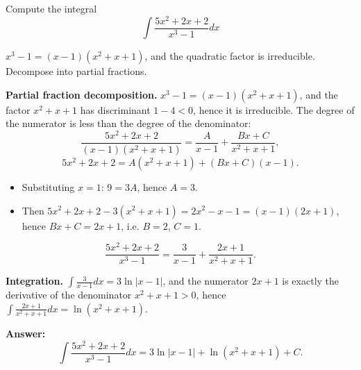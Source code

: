 
\begin{question}
Compute the integral
\[ \int\frac{5x^2+2x+2}{x^3-1}dx \]
\end{question}

\begin{hint}
$x^3-1=(x-1)(x^2+x+1)$, and the quadratic factor is irreducible. Decompose into partial fractions.
\end{hint}

\begin{solution}
\textbf{Partial fraction decomposition.} $x^3-1=(x-1)(x^2+x+1)$, and the factor $x^2+x+1$ has discriminant $1-4<0$, hence it is irreducible. The degree of the numerator is less than the degree of the denominator:
\[ \frac{5x^2+2x+2}{(x-1)(x^2+x+1)}=\frac{A}{x-1}+\frac{Bx+C}{x^2+x+1}, \]
\[ 5x^2+2x+2=A(x^2+x+1)+(Bx+C)(x-1). \]
\begin{itemize}
  \item Substituting $x=1$: $9=3A$, hence $A=3$.
  \item Then $5x^2+2x+2-3(x^2+x+1)=2x^2-x-1=(x-1)(2x+1)$, hence $Bx+C=2x+1$, i.e. $B=2$, $C=1$.
\end{itemize}
\[ \frac{5x^2+2x+2}{x^3-1}=\frac{3}{x-1}+\frac{2x+1}{x^2+x+1}. \]

\textbf{Integration.} $\int\frac{3}{x-1}dx=3\ln|x-1|$, and the numerator $2x+1$ is exactly the derivative of the denominator $x^2+x+1>0$, hence $\int\frac{2x+1}{x^2+x+1}dx=\ln(x^2+x+1)$.

\textbf{Answer:}
\[ \int\frac{5x^2+2x+2}{x^3-1}dx=\boxed{3\ln|x-1|+\ln(x^2+x+1)+C}. \]
\end{solution}
